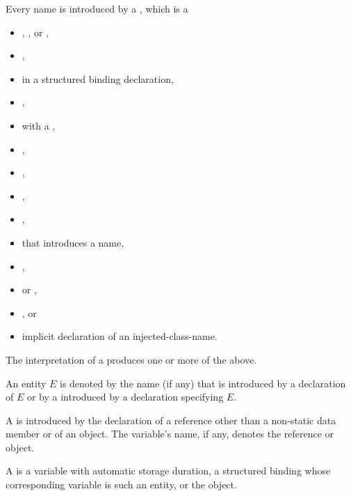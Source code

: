 \pnum
Every name is introduced by a , which is a
\begin{itemize}
\item
{},
, or
,
\item
{},
\item
{}
in a structured binding declaration,
\item
{},
\item
{} with a ,
\item
{},
\item
{},
\item
{},
\item
{},
\item
{}
that introduces a name,
\item
{},
\item
{} or
,
\item
{}, or
\item
implicit declaration of an injected-class-name.
\end{itemize}
\begin{note}
The interpretation of a  produces
one or more of the above.
\end{note}
An entity $E$ is denoted by the name (if any)
that is introduced by a declaration of $E$ or
by a  introduced by a declaration specifying $E$.

\pnum
A  is introduced by the
declaration of
a reference other than a non-static data member or of
an object. The variable's name, if any, denotes the reference or object.

\pnum
A  is a variable with
automatic storage duration,
a structured binding
whose corresponding variable is such an entity,
or the  object.

